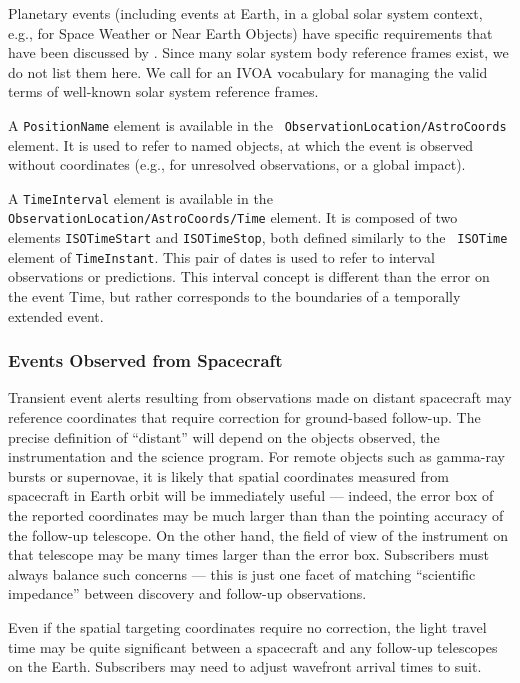 \documentclass[11pt,a4paper]{ivoa}
\begin{document}
Planetary events (including events at Earth, in a global solar system context,
e.g., for Space Weather or Near Earth Objects) have specific requirements that
have been discussed by \citet{2018arXiv181112680C}. Since many solar system body
reference frames exist, we do not list them here. We call for an IVOA vocabulary
for managing the valid terms of well-known solar system reference frames.

A {\tt PositionName} element is available in the {\tt
ObservationLocation/Ast\-roCoords} element. It is used to refer to named objects,
at which the event is observed without coordinates (e.g., for unresolved
observations, or a global impact).

A {\tt TimeInterval} element is available in the {\tt
ObservationLocation/Astro\-Coords/Time} element. It is composed of two elements
{\tt ISOTimeStart} and {\tt ISOTimeStop}, both defined similarly to the {\tt
ISOTime} element of {\tt TimeInstant}. This pair of dates is used to refer to
interval observations or predictions. This interval concept is different than
the error on the event Time, but rather corresponds to the boundaries of a
temporally extended event.


\subsubsection{Events Observed from Spacecraft}
\label{sec:3.4.5}
Transient event alerts resulting from observations made on distant spacecraft
may reference coordinates that require correction for ground-based follow-up.
The precise definition of ``distant'' will depend on the objects observed, the
instrumentation and the science program. For remote objects such as gamma-ray
bursts or supernovae, it is likely that spatial coordinates measured from
spacecraft in Earth orbit will be immediately useful --- indeed, the error box
of the reported coordinates may be much larger than than the pointing accuracy
of the follow-up telescope. On the other hand, the field of view of the
instrument on that telescope may be many times larger than the error box.
Subscribers must always balance such concerns --- this is just one facet of
matching ``scientific impedance'' between discovery and follow-up observations.

Even if the spatial targeting coordinates require no correction, the light
travel time may be quite significant between a spacecraft and any follow-up
telescopes on the Earth. Subscribers may need to adjust wavefront arrival times
to suit.
\end{document}
